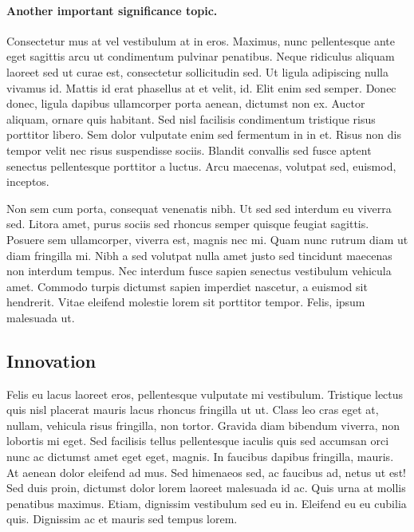 \documentclass[11pt,]{article}
\begin{document}
\hypertarget{another-important-significance-topic.}{%
\paragraph{Another important significance
topic.}\label{another-important-significance-topic.}}

Consectetur mus at vel vestibulum at in eros. Maximus, nunc pellentesque
ante eget sagittis arcu ut condimentum pulvinar penatibus. Neque
ridiculus aliquam laoreet sed ut curae est, consectetur sollicitudin
sed. Ut ligula adipiscing nulla vivamus id. Mattis id erat phasellus at
et velit, id. Elit enim sed semper. Donec donec, ligula dapibus
ullamcorper porta aenean, dictumst non ex. Auctor aliquam, ornare quis
habitant. Sed nisl facilisis condimentum tristique risus porttitor
libero. Sem dolor vulputate enim sed fermentum in in et. Risus non dis
tempor velit nec risus suspendisse sociis. Blandit convallis sed fusce
aptent senectus pellentesque porttitor a luctus. Arcu maecenas, volutpat
sed, euismod, inceptos.

Non sem cum porta, consequat venenatis nibh. Ut sed sed interdum eu
viverra sed. Litora amet, purus sociis sed rhoncus semper quisque
feugiat sagittis. Posuere sem ullamcorper, viverra est, magnis nec mi.
Quam nunc rutrum diam ut diam fringilla mi. Nibh a sed volutpat nulla
amet justo sed tincidunt maecenas non interdum tempus. Nec interdum
fusce sapien senectus vestibulum vehicula amet. Commodo turpis dictumst
sapien imperdiet nascetur, a euismod sit hendrerit. Vitae eleifend
molestie lorem sit porttitor tempor. Felis, ipsum malesuada ut.

\hypertarget{innovation}{%
\subsection{Innovation}\label{innovation}}

Felis eu lacus laoreet eros, pellentesque vulputate mi vestibulum.
Tristique lectus quis nisl placerat mauris lacus rhoncus fringilla ut
ut. Class leo cras eget at, nullam, vehicula risus fringilla, non
tortor. Gravida diam bibendum viverra, non lobortis mi eget. Sed
facilisis tellus pellentesque iaculis quis sed accumsan orci nunc ac
dictumst amet eget eget, magnis. In faucibus dapibus fringilla, mauris.
At aenean dolor eleifend ad mus. Sed himenaeos sed, ac faucibus ad,
netus ut est! Sed duis proin, dictumst dolor lorem laoreet malesuada id
ac. Quis urna at mollis penatibus maximus. Etiam, dignissim vestibulum
sed eu in. Eleifend eu eu cubilia quis. Dignissim ac et mauris sed
tempus lorem.
\end{document}
